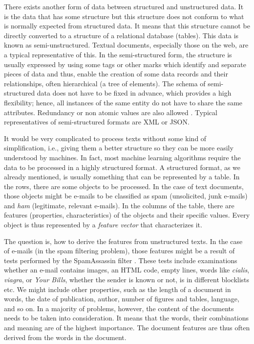 There exists another form of data between structured and unstructured data.
It is the data that has some structure but this structure does not conform to what is
normally expected from structured data. It means that this structure cannot be directly converted to a structure of a relational database (tables). This data is known
as semi-unstructured. Textual documents, especially those on the web, are a typical representative of this. In the semi-structured form, the structure is usually
expressed by using some tags or other marks which identify and separate pieces
of data and thus, enable the creation of some data records and their relationships, often hierarchical (a tree of elements). The schema of semi-structured data
does not have to be fixed in advance, which provides a high flexibility; hence,
all instances of the same entity do not have to share the same attributes. Redundancy or non atomic values are also allowed \cite{ref173,ref219}. Typical representatives
of semi-structured formats are XML or JSON.

It would be very complicated to process texts without some kind of simplification, i.e., giving them a better structure so they can be more easily understood by machines. In fact, most machine learning algorithms require the data to
be processed in a highly structured format. A structured format, as we already
mentioned, is usually something that can be represented by a table. In the rows,
there are some objects to be processed. In the case of text documents, those objects might be e-mails to be classified as spam (unsolicited, junk e-mails) and
\textit{ham} (legitimate, relevant e-mails). In the columns of the table, there are features
(properties, characteristics) of the objects and their specific values. Every object
is thus represented by a \textit{feature vector} that characterizes it.

The question is, how to derive the features from unstructured texts. In the
case of e-mails (in the spam filtering problem), those features might be a result
of tests performed by the SpamAssassin filter \cite{ref89}. These tests include examinations whether an e-mail contains images, an HTML code, empty lines, words
like \textit{cialis}, \textit{viagra}, or \textit{Your Bills}, whether the sender is known or not, is in different blocklists etc. We might include other properties, such as the length of a
document in words, the date of publication, author, number of figures and tables, language, and so on. In a majority of problems, however, the content of
the documents needs to be taken into consideration. It means that the words,
their combinations and meaning are of the highest importance. The document
features are thus often derived from the words in the document.

